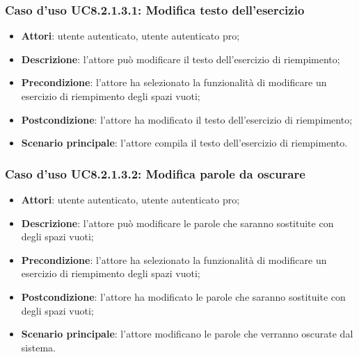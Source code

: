 \subsubsection{Caso d'uso UC8.2.1.3.1: Modifica testo dell'esercizio}
	\begin{itemize}
		\item
			\textbf{Attori}: utente autenticato, utente autenticato pro;
		\item		
			\textbf{Descrizione}: l'attore può modificare il testo dell'esercizio di riempimento;
		\item
			\textbf{Precondizione}: l'attore ha selezionato la funzionalità di modificare un esercizio di riempimento degli spazi vuoti; 
		\item
			\textbf{Postcondizione}: l'attore ha modificato il testo dell'esercizio di riempimento;
		\item
			\textbf{Scenario principale}: l'attore compila il testo dell'esercizio di riempimento.
	\end{itemize}


\subsubsection{Caso d'uso UC8.2.1.3.2: Modifica parole da oscurare}
	\begin{itemize}
		\item
			\textbf{Attori}: utente autenticato, utente autenticato pro;
		\item		
			\textbf{Descrizione}: l'attore può modificare le parole che saranno sostituite con degli spazi vuoti;
		\item
			\textbf{Precondizione}: l'attore ha selezionato la funzionalità di modificare un esercizio di riempimento degli spazi vuoti; 
		\item
			\textbf{Postcondizione}: l'attore ha modificato le parole che saranno sostituite con degli spazi vuoti;
		\item
			\textbf{Scenario principale}: l'attore modificano le parole che verranno oscurate dal sistema.
	\end{itemize}